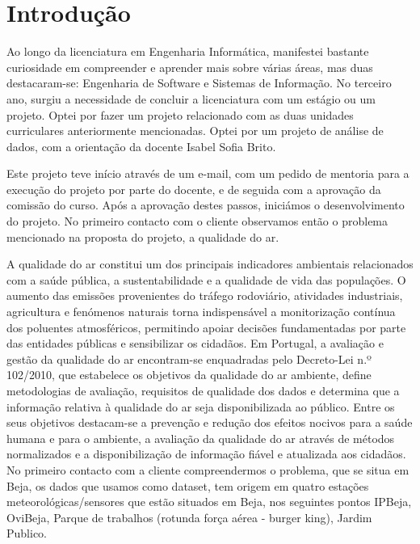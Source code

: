 \chapter{Introdução}
\label{intro}


Ao longo da licenciatura em Engenharia Informática, manifestei bastante curiosidade em compreender e aprender mais sobre várias áreas, mas duas destacaram-se: Engenharia de Software e Sistemas de Informação. No terceiro ano, surgiu a necessidade de concluir a licenciatura com um estágio ou um projeto. Optei por fazer um projeto relacionado com as duas unidades curriculares anteriormente mencionadas. Optei por um projeto de análise de dados, com a orientação da docente Isabel Sofia Brito.

Este projeto teve início através de um e-mail, com um pedido de mentoria para a execução do projeto por parte do docente, e de seguida com a aprovação da comissão do curso. Após a aprovação destes passos, iniciámos o desenvolvimento do projeto. No primeiro contacto com o cliente observamos então o problema mencionado na proposta do projeto, a qualidade do ar. 

A qualidade do ar constitui um dos principais indicadores ambientais relacionados 
com a saúde pública, a sustentabilidade e a qualidade de vida das populações. O 
aumento das emissões provenientes do tráfego rodoviário, atividades industriais, 
agricultura e fenómenos naturais torna indispensável a monitorização contínua dos 
poluentes atmosféricos, permitindo apoiar decisões fundamentadas por parte das 
entidades públicas e sensibilizar os cidadãos.
Em Portugal, a avaliação e gestão da qualidade do ar encontram-se enquadradas 
pelo Decreto-Lei n.º 102/2010, que estabelece os objetivos da qualidade do ar 
ambiente, define metodologias de avaliação, requisitos de qualidade dos dados e 
determina que a informação relativa à qualidade do ar seja disponibilizada ao 
público. Entre os seus objetivos destacam-se a prevenção e redução dos efeitos 
nocivos para a saúde humana e para o ambiente, a avaliação da qualidade do ar 
através de métodos normalizados e a disponibilização de informação fiável e atualizada aos cidadãos.
No primeiro contacto com a cliente compreendermos o problema, que se situa em Beja, os dados que usamos como dataset, tem origem em quatro estações meteorológicas/sensores que estão situados em Beja, nos  seguintes pontos IPBeja, OviBeja, Parque de trabalhos (rotunda força aérea - burger king), Jardim Publico. 
